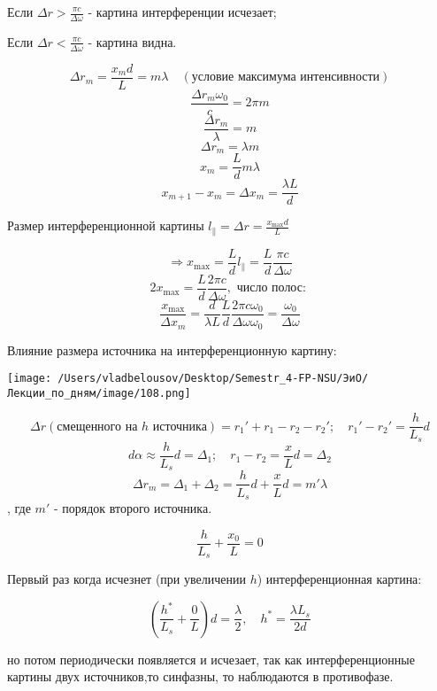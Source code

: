 \documentclass[12pt, a4paper]{report}
\begin{document}
Если \( \Delta r > \displaystyle  \frac{ \pi c }{\Delta \omega }   \) - картина интерференции исчезает; 

\vspace{10pt}

Если \( \displaystyle  \Delta r < \frac{\pi c }{\Delta \omega }  \) - картина видна.

\[ \Delta r_m = \frac{ x_m d }{L } = m \lambda \quad  (\text{условие максимума интенсивности} )  \] 
\[ \frac{\Delta r_m \omega_0 }{c } = 2 \pi m   \] 
\[ \frac{\Delta r_m }{\lambda }     = m   \] 
\[ \Delta r_m = \lambda m  \] 
\[ x_m = \frac{L }{d} m \lambda   \] 
\[ x_{m+1 } - x_m = \Delta x_m = \frac{\lambda L }{d}  \] 

Размер интерференционной картины \( \displaystyle  l_{\parallel} = \Delta r = \frac{x_{ \max  } d }{L }   \) 

\[ \Rightarrow  x_{ \max  } = \frac{L}{d } l_{ \parallel} = \frac{L}{d }  \frac{\pi c }{\Delta \omega }    \] 
\[ 2 x_{ \max  } = \frac{L}{d }  \frac{ 2 \pi c }{\Delta \omega } , \text{ число полос: }    \] 
\[ \frac{x _{ \max  } }{\Delta x_m }= \frac{d}{ \lambda L } \frac{L }{d} \frac{ 2 \pi c \omega_0 }{\Delta \omega \omega_0} = \frac{\omega_0}{\Delta \omega}      \] 

Влияние размера источника на интерференционную картину: 

\begin{center}
    \texttt{[image: /Users/vladbelousov/Desktop/Semestr\_4-FP-NSU/ЭиО/Лекции\_по\_дням/image/108.png]}
\end{center} 

\[ \Delta r (\text{смещенного на } h \text{ источника} ) = r_1 ' + r_1 - r_2 -r_2 ' ; \quad  r_1 ' - r_2 ' = \frac{h}{L_s } d \] 
\[ d \alpha \approx \frac{h}{L_s} d = \Delta_1 ;\quad  r_1 -r_2 = \frac{x}{L }  d = \Delta_2  \] 
\[ \Delta r_m = \Delta_1 + \Delta_2 = \frac{h}{L_s } d + \frac{x}{L }  d = m' \lambda   \]
, где \( m '  \) - порядок второго источника. 

\[ \frac{h}{L_s } + \frac{x_0 }{L } = 0   \] 

Первый раз когда исчезнет (при увеличении \( h \)) интерференционная картина:

\[ \displaystyle  \left( \frac{h^* }{L_s } + \frac{0}{L }   \right)d = \frac{\lambda}{2 }  , \quad  h^* = \frac{\lambda L_s}{2d}  \] 

но потом периодически появляется и исчезает, так как интерференционные картины двух источников,то синфазны, то наблюдаются в противофазе.
\end{document}

